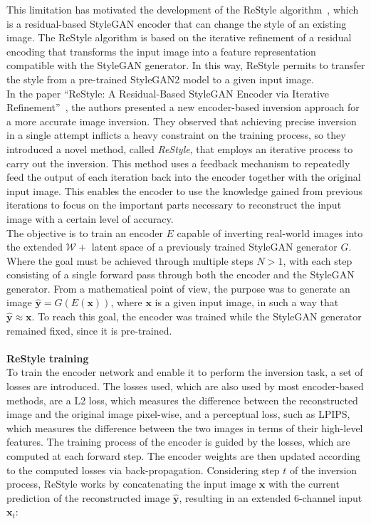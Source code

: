 \noindent This limitation has motivated the development of the ReStyle algorithm~\cite{alaluf2021restyle}, which is a residual-based StyleGAN encoder that can change the style of an existing image. The ReStyle algorithm is based on the iterative refinement of a residual encoding that transforms the input image into a feature representation compatible with the StyleGAN generator. In this way, ReStyle permits to transfer the style from a pre-trained StyleGAN2 model to a given input image.\\
In the paper “ReStyle: A Residual-Based StyleGAN Encoder via Iterative Refinement”~\cite{alaluf2021restyle}, the authors presented a new encoder-based inversion approach for a more accurate image inversion. They observed that achieving precise inversion in a single attempt inflicts a heavy constraint on the training process, so they introduced a novel method, called \textit{ReStyle}, that employs an iterative process to carry out the inversion. This method uses a feedback mechanism to repeatedly feed the output of each iteration back into the encoder together with the original input image. This enables the encoder to use the knowledge gained from previous iterations to focus on the important parts necessary to reconstruct the input image with a certain level of accuracy.\\
The objective is to train an encoder $E$ capable of inverting real-world images into the extended $\mathcal{W}+$ latent space of a previously trained StyleGAN generator $G$. Where the goal must be achieved through multiple steps $N>1$, with each step consisting of a single forward pass through both the encoder and the StyleGAN generator. From a mathematical point of view, the purpose was to generate an image $\hat{\textbf{y}} = G(E(\textbf{x}))$, where $\textbf{x}$ is a given input image, in such a way that $\hat{\textbf{y}} \approx \textbf{x}$. To reach this goal, the encoder was trained while the StyleGAN generator remained fixed, since it is pre-trained.\\ \\
%
\textbf{ReStyle training}\\
To train the encoder network and enable it to perform the inversion task, a set of losses are introduced. The losses used, which are also used by most encoder-based methods, are a L2 loss, which measures the difference between the reconstructed image and the original image pixel-wise, and a perceptual loss, such as LPIPS, which measures the difference between the two images in terms of their high-level features. The training process of the encoder is guided by the losses, which are computed at each forward step. The encoder weights are then updated according to the computed losses via back-propagation. Considering step $t$ of the inversion process, ReStyle works by concatenating the input image $\textbf{x}$ with the current prediction of the reconstructed image $\hat{\textbf{y}}$, resulting in an extended 6-channel input $\textbf{x}_t$:
